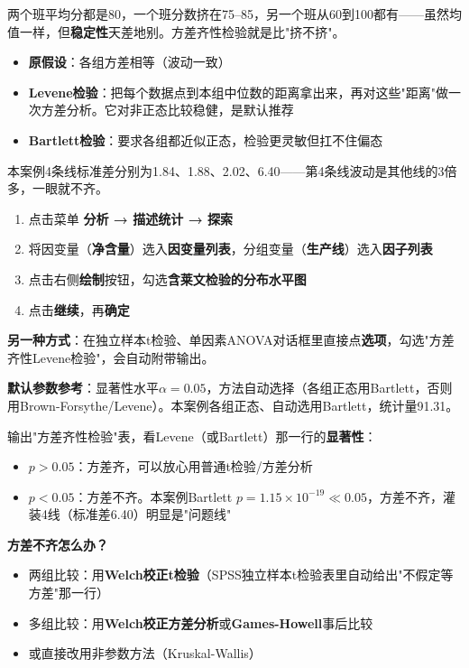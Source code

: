 \begin{algoprinciple}
两个班平均分都是80，一个班分数挤在75--85，另一个班从60到100都有——虽然均值一样，但\textbf{稳定性}天差地别。方差齐性检验就是比"挤不挤"。

\begin{itemize}
    \item \textbf{原假设}：各组方差相等（波动一致）
    \item \textbf{Levene检验}：把每个数据点到本组中位数的距离拿出来，再对这些"距离"做一次方差分析。它对非正态比较稳健，是默认推荐
    \item \textbf{Bartlett检验}：要求各组都近似正态，检验更灵敏但扛不住偏态
\end{itemize}

本案例4条线标准差分别为1.84、1.88、2.02、6.40——第4条线波动是其他线的3倍多，一眼就不齐。
\end{algoprinciple}

\begin{algosposs}
\begin{enumerate}
    \item 点击菜单 \textbf{分析 → 描述统计 → 探索}
    \item 将因变量（\textbf{净含量}）选入\textbf{因变量列表}，分组变量（\textbf{生产线}）选入\textbf{因子列表}
    \item 点击右侧\textbf{绘制}按钮，勾选\textbf{含莱文检验的分布水平图}
    \item 点击\textbf{继续}，再\textbf{确定}
\end{enumerate}

\textbf{另一种方式}：在独立样本t检验、单因素ANOVA对话框里直接点\textbf{选项}，勾选"方差齐性Levene检验"，会自动附带输出。

\textbf{默认参数参考}：显著性水平$\alpha=0.05$，方法自动选择（各组正态用Bartlett，否则用Brown-Forsythe/Levene）。本案例各组正态、自动选用Bartlett，统计量91.31。
\end{algosposs}

\begin{algoresult}
输出"方差齐性检验"表，看Levene（或Bartlett）那一行的\textbf{显著性}：
\begin{itemize}
    \item $p>0.05$：方差齐，可以放心用普通t检验/方差分析
    \item $p<0.05$：方差不齐。本案例Bartlett $p=1.15\times10^{-19}\ll0.05$，方差不齐，灌装4线（标准差6.40）明显是"问题线"
\end{itemize}

\textbf{方差不齐怎么办？}
\begin{itemize}
    \item 两组比较：用\textbf{Welch校正t检验}（SPSS独立样本t检验表里自动给出"不假定等方差"那一行）
    \item 多组比较：用\textbf{Welch校正方差分析}或\textbf{Games-Howell}事后比较
    \item 或直接改用非参数方法（Kruskal-Wallis）
\end{itemize}
\end{algoresult}

